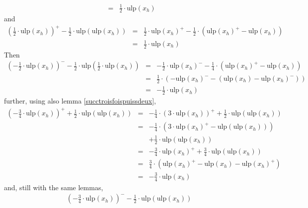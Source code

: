 \documentclass[a4paper,10pt,twoside]{article}
\newenvironment{proof}[1][Proof]{\begin{trivlist}
\item[\hskip \labelsep {\bfseries #1}]}{\end{trivlist}}
\newcommand{\hi}{\ensuremath{\mathit{h}}}
\newcommand{\mUlp}{\ensuremath{\mathrm{ulp}}}
\begin{document}
\begin{proof}
\begin{eqnarray*}
& = & \frac{1}{2} \cdot  \mUlp\left( x_\hi \right)
\end{eqnarray*}
and
\begin{eqnarray*}
\left( \frac{1}{2} \cdot  \mUlp\left( x_\hi \right)  \right)^+ - \frac{1}{2} \cdot \mUlp\left(  \mUlp\left( x_\hi \right)  \right) & = &
\frac{1}{2} \cdot  \mUlp\left( x_\hi \right)^+ - \frac{1}{2} \cdot \left(  \mUlp\left( x_\hi \right)^+ -  \mUlp\left( x_\hi \right)  \right) \\
& = & \frac{1}{2} \cdot  \mUlp\left( x_\hi \right)
\end{eqnarray*}
Then
\begin{eqnarray*}
\left( - \frac{1}{2} \cdot  \mUlp\left( x_\hi \right)  \right)^- - \frac{1}{2} \cdot \mUlp\left( \frac{1}{2} \cdot  \mUlp\left( x_\hi \right)  \right)
& = & - \frac{1}{2} \cdot  \mUlp\left( x_\hi \right)^- - \frac{1}{4} \cdot \left(  \mUlp\left( x_\hi \right)^+ -  \mUlp\left( x_\hi \right)  \right) \\
& = & \frac{1}{2} \cdot \left( - \mUlp\left( x_\hi \right)^- - \left(  \mUlp\left( x_\hi \right)  -  \mUlp\left( x_\hi \right)^- \right) \right) \\
& = & - \frac{1}{2} \cdot  \mUlp\left( x_\hi \right)
\end{eqnarray*}
further, using also lemma \ref{succtroisfoispuissdeux},
\begin{eqnarray*}
\left( - \frac{3}{4} \cdot \mUlp\left( x_\hi \right) \right)^+
+ \frac{1}{2} \cdot \mUlp\left( \mUlp\left( x_\hi \right) \right)
& = & - \frac{1}{4} \cdot \left( 3 \cdot \mUlp\left( x_\hi \right) \right)^+ +
\frac{1}{2} \cdot \mUlp\left( \mUlp\left( x_\hi \right) \right) \\
& = & - \frac{1}{4} \cdot \left( 3 \cdot \mUlp\left( x_\hi \right)^+ - \mUlp\left( \mUlp\left( x_\hi \right)\right)\right)
\\ & & + \frac{1}{2} \cdot \mUlp\left( \mUlp\left( x_\hi \right) \right) \\
& = & - \frac{3}{4} \cdot \mUlp\left( x_\hi \right)^+ +
\frac{3}{4} \cdot \mUlp\left( \mUlp\left( x_\hi \right) \right) \\
& = & \frac{3}{4}\cdot\left( \mUlp\left( x_\hi \right)^+ -\mUlp\left( x_\hi\right) -\mUlp\left( x_\hi \right)^+ \right) \\
& = & -\frac{3}{4} \cdot \mUlp\left( x_\hi \right)
\end{eqnarray*}
and, still with the same lemmas,
\begin{eqnarray*}
\left( - \frac{3}{4} \cdot \mUlp\left( x_\hi \right) \right)^-
- \frac{1}{2} \cdot \mUlp \left( \mUlp\left( x_\hi \right) \right)

\end{eqnarray*}
\end{proof}
\end{document}

